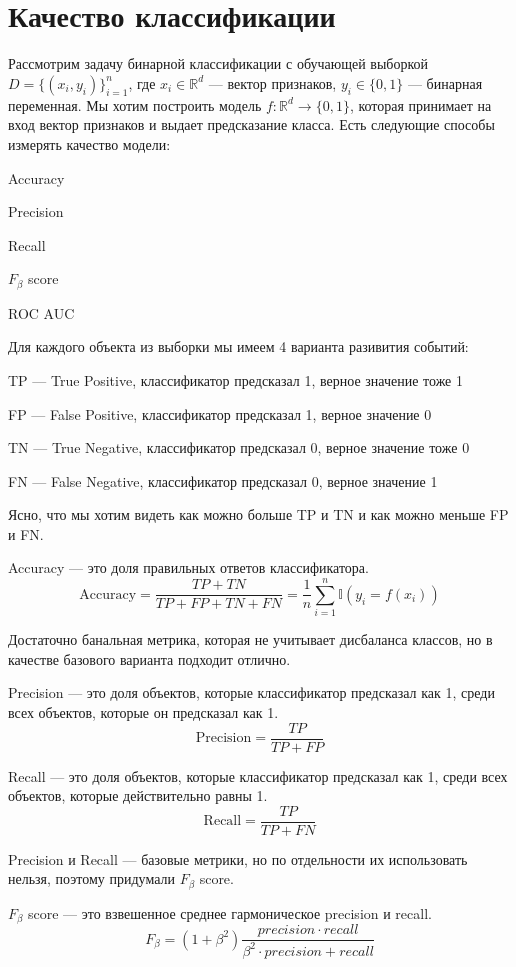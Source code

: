 \section{Качество классификации}
Рассмотрим задачу бинарной классификации с обучающей выборкой $D = \{(x_i, y_i)\}_{i=1}^n$, где $x_i \in \mathbb{R}^d$ --- вектор признаков, $y_i \in \{0, 1\}$ --- бинарная переменная.
Мы хотим построить модель $f: \mathbb{R}^d \to \{0, 1\}$, которая принимает на вход вектор признаков и выдает предсказание класса.
Есть следующие способы измерять качество модели:

Accuracy

Precision

Recall

$F_{\beta}$ score

ROC AUC

Для каждого объекта из выборки мы имеем 4 варианта разивития событий:

TP --- True Positive, классификатор предсказал 1, верное значение тоже 1

FP --- False Positive, классификатор предсказал 1, верное значение 0

TN --- True Negative, классификатор предсказал 0, верное значение тоже 0

FN --- False Negative, классификатор предсказал 0, верное значение 1


Ясно, что мы хотим видеть как можно больше TP и TN и как можно меньше FP и FN.

Accuracy --- это доля правильных ответов классификатора.
$$
    \text{Accuracy} = \frac{TP + TN}{TP + FP + TN + FN} = \frac{1}{n} \sum_{i=1}^n \mathbb{I}(y_i = f(x_i))
$$

Достаточно банальная метрика, которая не учитывает дисбаланса классов, но в качестве базового варианта подходит отлично.

Precision --- это доля объектов, которые классификатор предсказал как 1, среди всех объектов, которые он предсказал как 1.
$$
    \text{Precision} = \frac{TP}{TP + FP}
$$

Recall --- это доля объектов, которые классификатор предсказал как 1, среди всех объектов, которые действительно равны 1.
$$
    \text{Recall} = \frac{TP}{TP + FN}
$$

Precision и Recall --- базовые метрики, но по отдельности их использовать нельзя, поэтому придумали $F_{\beta}$ score.

$F_{\beta}$ score --- это взвешенное среднее гармоническое precision и recall.
$$
    F_{\beta} = (1 + \beta^2) \frac{precision \cdot recall}{\beta^2 \cdot precision + recall}
$$

